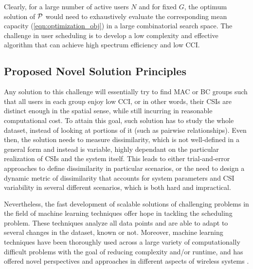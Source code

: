 Clearly, for a large number of active
users $N$ and for fixed $G$, 
the optimum solution of ${\cal P}$
would need to exhaustively evaluate 
the corresponding mean capacity (\ref{eqn:optimization_obj}) in a
large combinatorial search space. The 
challenge in user scheduling
is to develop a low complexity and effective
algorithm that can achieve high spectrum
efficiency and low CCI. 


\subsection{Proposed Novel Solution Principles}

Any solution to this challenge will essentially try to find MAC or BC groups such that all users in each group enjoy low CCI, or in other words, their CSIs are distinct enough in the spatial sense, while still incurring in reasonable computational cost.  
To attain this goal, such solution has to study the whole dataset, instead of looking at portions of it (such as pairwise relationships). Even then, the solution needs to measure dissimilarity, which is not well-defined in a general form and instead is variable, highly dependant on the particular realization of CSIs and the system itself. This leads to either trial-and-error approaches to define dissimilarity in particular scenarios, or the need to design a dynamic metric of dissimilarity that accounts for system parameters and CSI variability in several different scenarios, which is both hard and impractical. 

Nevertheless, the fast development of scalable solutions of challenging problems in the field of machine learning techniques offer hope in tackling the scheduling problem. These techniques analyze all data points and are able to adapt to several changes in the dataset, known or not. Moreover, machine learning techniques have been thoroughly used across a large variety of computationally difficult problems with the goal of reducing complexity and/or runtime, and has offered novel perspectives and approaches in different aspects of wireless systems \cite{Jiang17, Kaufman90, Cui18, Morocho19, Xu14}. 

